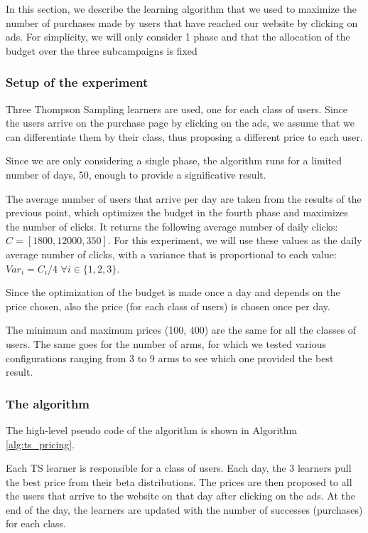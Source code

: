 \newcommand{\pluseq}{\mathrel{+}=}

In this section, we describe the learning algorithm that we used to maximize the number of purchases made by users that have reached our website by clicking on ads.
For simplicity, we will only consider 1 phase and that the allocation of the budget over the three subcampaigns is fixed 

\subsubsection{Setup of the experiment}
Three Thompson Sampling learners are used, one for each class of users. Since the users arrive on the purchase page by clicking on the ads, we assume that we can differentiate them by their class, thus proposing a different price to each user.

Since we are only considering a single phase, the algorithm runs for a limited number of days, 50, enough to provide a significative result.

The average number of users that arrive per day are taken from the results of the previous point, which optimizes the budget in the fourth phase and maximizes the number of clicks. It returns the following average number of daily clicks: $C=[1800, 12000, 350]$. For this experiment, we will use these values as the daily average number of clicks, with a variance that is proportional to each value: $Var_i = C_i / 4$ $\forall{i} \in \{1,2,3\}$.

Since the optimization of the budget is made once a day and depends on the price chosen, also the price (for each class of users) is chosen once per day.

The minimum and maximum prices (100, 400) are the same for all the classes of users. The same goes for the number of arms, for which we tested various configurations ranging from 3 to 9 arms to see which one provided the best result.

\subsubsection{The algorithm}
The high-level pseudo code of the algorithm is shown in Algorithm \ref{alg:ts_pricing}.

Each TS learner is responsible for a class of users. Each day, the 3 learners pull the best price from their beta distributions. The prices are then proposed to all the users that arrive to the website on that day after clicking on the ads. At the end of the day, the learners are updated with the number of successes (purchases) for each class.

